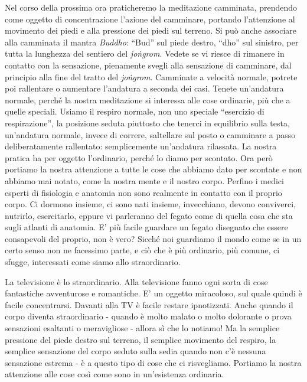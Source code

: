 
Nel corso della prossima ora praticheremo la meditazione camminata,
prendendo come oggetto di concentrazione l'azione del camminare,
portando l'attenzione al movimento dei piedi e alla pressione dei piedi
sul terreno. Si può anche associare alla camminata il mantra \textit{Buddho}:
``Bud'' sul piede destro, ``dho'' sul sinistro, per tutta la lunghezza del
sentiero del \textit{joṅgrom}. Vedete se vi riesce di rimanere in contatto con la
sensazione, pienamente svegli alla sensazione di camminare, dal
principio alla fine del tratto del \textit{joṅgrom}. Camminate a velocità
normale, potrete poi rallentare o aumentare l'andatura a seconda dei
casi. Tenete un'andatura normale, perché la nostra meditazione si
interessa alle cose ordinarie, più che a quelle speciali. Usiamo il
respiro normale, non uno speciale ``esercizio di respirazione”, la
posizione seduta piuttosto che tenerci in equilibrio sulla testa,
un'andatura normale, invece di correre, saltellare sul posto o camminare
a passo deliberatamente rallentato: semplicemente un'andatura rilassata.
La nostra pratica ha per oggetto l'ordinario, perché lo diamo per
scontato. Ora però portiamo la nostra attenzione a tutte le cose che
abbiamo dato per scontate e non abbiamo mai notato, come la nostra mente
e il nostro corpo. Perfino i medici esperti di fisiologia e anatomia non
sono realmente in contatto con il proprio corpo. Ci dormono insieme, ci
sono nati insieme, invecchiano, devono conviverci, nutrirlo,
esercitarlo, eppure vi parleranno del fegato come di quella cosa che sta
sugli atlanti di anatomia. E' più facile guardare un fegato disegnato
che essere consapevoli del proprio, non è vero? Sicché noi guardiamo il
mondo come se in un certo senso non ne facessimo parte, e ciò che è più
ordinario, più comune, ci sfugge, interessati come siamo allo
straordinario.

La televisione è lo straordinario. Alla televisione fanno ogni sorta di
cose fantastiche avventurose e romantiche. E' un oggetto miracoloso, sul
quale quindi è facile concentrarsi. Davanti alla TV è facile restare
ipnotizzati. Anche quando il corpo diventa straordinario - quando è
molto malato o molto dolorante o prova sensazioni esaltanti o
meravigliose - allora sì che lo notiamo! Ma la semplice pressione del
piede destro sul terreno, il semplice movimento del respiro, la semplice
sensazione del corpo seduto sulla sedia quando non c'è nessuna
sensazione estrema - è a questo tipo di cose che ci risvegliamo.
Portiamo la nostra attenzione alle cose così come sono in un'esistenza
ordinaria.

